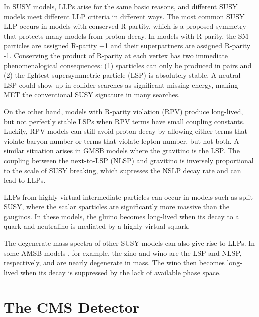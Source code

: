 \documentclass[12pt]{article}
\begin{document}
    In SUSY models, LLPs arise for the same basic reasons, and different SUSY models meet different LLP criteria in different ways. The most common  SUSY LLP occurs in models with conserved R-partity, which is a proposed symmetry that protects many models from proton decay. In models with R-parity, the SM particles are assigned R-parity +1 and their superpartners are assigned R-parity -1. Conserving the product of R-parity at each vertex has two immediate phenomenalogical consequences: (1) sparticles can only be produced in pairs and (2) the lightest supersymmetric particle (LSP) is absolutely stable. A neutral LSP could show up in collider searches as significant missing energy, making MET the conventional SUSY signature in many searches.

    On the other hand, models with R-parity violation (RPV) produce long-lived, but not perfectly stable LSPs when RPV terms have small coupling constants. Luckily, RPV models can still avoid proton decay by allowing either terms that violate baryon number or terms that violate lepton number, but not both. A similar situation arises in GMSB models where the gravitino is the LSP. The coupling between the next-to-LSP (NLSP) and gravitino is inversely proportional to the scale of SUSY breaking, which supresses the NSLP decay rate and can lead to LLPs. 

    LLPs from highly-virtual intermediate particles can occur in models such as split SUSY, where the scalar sparticles are significantly more massive than the gauginos. In these models, the gluino becomes long-lived when its decay to a quark and neutralino is mediated by a highly-virtual squark.  

    The degenerate mass spectra of other SUSY models can also give rise to LLPs. In some AMSB models , for example, the zino and wino are the LSP and NLSP, respectively, and are nearly degenerate in mass. The wino then becomes long-lived when its decay is suppressed by the lack of available phase space. 

\section{The CMS Detector}
\end{document}
